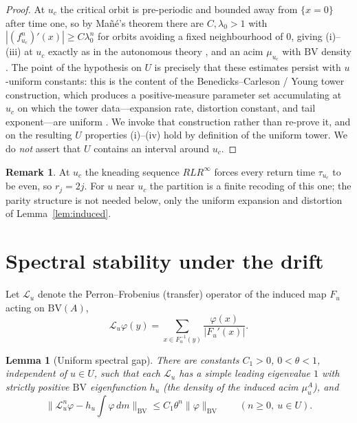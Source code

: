 \documentclass[11pt,a4paper]{article}
\newtheorem{lemma}[theorem]{Lemma}
\theoremstyle{definition}
\newtheorem{remark}[theorem]{Remark}
\begin{document}
\begin{proof}
At $u_c$ the critical orbit is pre-periodic and bounded away from
$\{x=0\}$ after time one, so by Ma\~n\'e's theorem
\cite[Thm.\ A]{mane1985hyperbolicity} there are $C,\lambda_0>1$ with
$|(f_{u_c}^n)'(x)|\ge C\lambda_0^n$ for orbits avoiding a fixed
neighbourhood of $0$, giving (i)--(iii) at $u_c$ exactly as in the
autonomous theory \cite[Ch.\ III]{demelo1993one}, and an acim $\mu_{u_c}$
with $\mathrm{BV}$ density \cite[Thm.\ 1]{misiurewicz1981absolutely}.
The point of the hypothesis on $U$ is precisely that these estimates
persist with $u$-uniform constants: this is the content of the
Benedicks--Carleson / Young tower construction, which produces a
positive-measure parameter set accumulating at $u_c$ on which the tower
data---expansion rate, distortion constant, and tail exponent---are
uniform \cite{young1992decay}. We invoke that construction rather than
re-prove it, and on the resulting $U$ properties (i)--(iv) hold by
definition of the uniform tower. We do \emph{not} assert that $U$
contains an interval around $u_c$.
\end{proof}

\begin{remark}
\label{rem:even-returns}
At $u_c$ the kneading sequence $RLR^\infty$ forces every return time
$\tau_{u_c}$ to be even, so $r_j = 2j$. For $u$ near $u_c$ the partition
is a finite recoding of this one; the parity structure is not needed
below, only the uniform expansion and distortion of
Lemma~\ref{lem:induced}.
\end{remark}

\section{Spectral stability under the drift}
\label{sec:spectral}

Let $\mathcal{L}_u$ denote the Perron--Frobenius (transfer) operator of
the induced map $F_u$ acting on $\mathrm{BV}(A)$,
\[
  \mathcal{L}_u \varphi(y)
  = \sum_{x \in F_u^{-1}(y)} \frac{\varphi(x)}{|F_u'(x)|}.
\]

\begin{lemma}[Uniform spectral gap]
\label{lem:gap}
There are constants $C_1 > 0$, $0 < \theta < 1$, independent of
$u \in U$, such that each $\mathcal{L}_u$ has a simple leading
eigenvalue $1$ with strictly positive $\mathrm{BV}$ eigenfunction
$h_u$ (the density of the induced acim $\mu_u^A$), and
\[
  \bigl\| \mathcal{L}_u^n \varphi - h_u \textstyle\int \varphi \,dm \bigr\|_{\mathrm{BV}}
  \leq C_1 \theta^n \|\varphi\|_{\mathrm{BV}}
  \qquad (n \geq 0,\ u \in U).
\]
\end{lemma}
\end{document}
